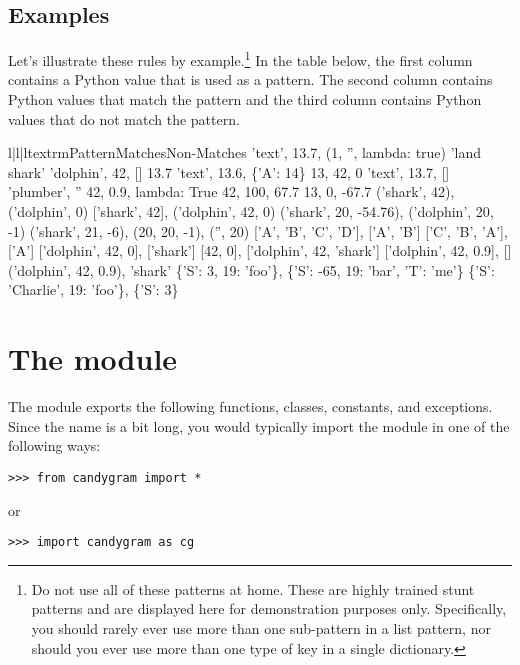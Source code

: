 \documentclass{howto}
\newcommand{\lessthan}[0]{\begin{math}<\end{math}}
\newcommand{\greaterthan}[0]{\begin{math}>\end{math}}
\newcommand{\lessthan}[0]{<}
\newcommand{\greaterthan}[0]{>}
\begin{document}
\subsection{Examples}
Let's illustrate these rules by example.\footnote
{Do not use all of these patterns at home. These are highly trained stunt
patterns and are displayed here for demonstration purposes only. Specifically,
you should rarely ever use more than one sub-pattern in a list pattern, nor
should you ever use more than one type of key in a single dictionary.}
 In the table below, the first column contains a Python value that is used as a
pattern. The second column contains Python values that match the pattern and the
third column contains Python values that do not match the pattern.
\begin{tableiii}{l|l|l}{textrm}{Pattern}{Matches}{Non-Matches}
	{'text', 13.7, (1, '', lambda: true)}
	{}
	{'land shark'}
	{'dolphin', 42, []}
	{13.7}
	{'text', 13.6, \{'A': 14\}}
	{13, 42, 0}
	{'text', 13.7, []}
	{'plumber', ''}
	{42, 0.9, lambda: True}
\lineiii{lambda x: x \greaterthan\ 20}
	{42, 100, 67.7}
	{13, 0, -67.7}
	{('shark', 42), ('dolphin', 0)}
	{['shark', 42], ('dolphin', 42, 0)}
\lineiii{(str, 20, lambda x: x \lessthan\ 0)}
	{('shark', 20, -54.76), ('dolphin', 20, -1)}
	{('shark', 21, -6), (20, 20, -1), ('', 20)}
	{['A', 'B', 'C', 'D'], ['A', 'B']}
	{['C', 'B', 'A'], ['A']}
	{['dolphin', 42, 0], ['shark']}
	{[42, 0], ['dolphin', 42, 'shark']}
\lineiii{[Any]}
	{['dolphin', 42, 0.9], []}
	{('dolphin', 42, 0.9), 'shark'}
	{\{'S': 3, 19: 'foo'\}, \{'S': -65, 19: 'bar', 'T': 'me'\}}
	{\{'S': 'Charlie', 19: 'foo'\}, \{'S': 3\}}
\end{tableiii}



\section{The  module}


The  module exports the following functions, classes,
constants, and exceptions. Since the name  is a bit long, you
would typically import the module in one of the following ways:
\begin{verbatim}
>>> from candygram import *
\end{verbatim}
or
\begin{verbatim}
>>> import candygram as cg
\end{verbatim}
\end{document}
